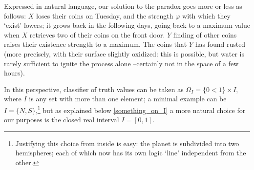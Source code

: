 \begin{example}
	Expressed in natural language, our solution to the paradox goes more or less as follows: $X$ loses their coins on Tuesday, and the strength $\varphi$ with which they `exist' lowers; it grows back in the following days, going back to a maximum value when $X$ retrieves two of their coins on the front door. $Y$ finding of other coins raises their existence strength to a maximum. The coins that $Y$ has found rusted (more precisely, with their surface slightly oxidized: this is possible, but water is rarely sufficient to ignite the process alone --certainly not in the space of a few hours).
	\begin{remark}\label{our_beloved_interval}
		In this perspective, \tlon classifier of truth values can be taken as $\Omega_I = \{0<1\}\times I$, where $I$ is any set with more than one element; a minimal example can be $I=\{N,S\}$,\footnote{Justifying this choice from inside \tlon is easy: the planet is subdivided into two hemispheres; each of which now has its own logic `line' independent from the other.} but as explained below \autoref{something_on_I} a more natural choice for our purposes is the closed real interval $I=[0,1]$.


\end{remark}
\end{example}
